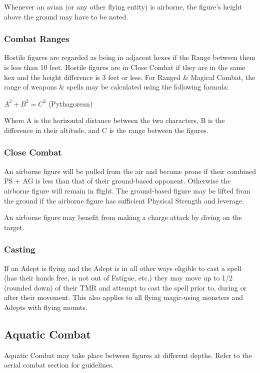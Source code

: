 \begin{multicols*}{3}
Whenever an avian (or any other flying entity) is airborne, the
figure's height above the ground may have to be noted.

\subsubsection{Combat Ranges}

Hostile figures are regarded as being in adjacent hexes if the Range
between them is less than 10 feet. Hostile figures are in Close Combat
if they are in the same hex and the height difference is 3 feet or
less. For Ranged \& Magical Combat, the range of weapons \& spells may
be calculated using the following formula:

$A^2 + B^2 = C^2$ (Pythagorean)

Where A is the horizontal distance between the two characters, B is
the difference in their altitude, and C is the range between the
figures.

\subsubsection{Close Combat}

An airborne figure will be pulled from the air and become prone if
their combined PS + AG is less than that of their ground-based
opponent. Otherwise the airborne figure will remain in flight. The
ground-based figure may be lifted from the ground if the airborne
figure has sufficient Physical Strength and leverage.

An airborne figure may benefit from making a charge attack by diving
on the target.

\subsubsection{Casting}

If an Adept is flying and the Adept is in all other ways eligible to
cast a spell (has their hands free, is not out of Fatigue, etc.) they
may move up to 1/2 (rounded down) of their TMR and attempt to cast the
spell prior to, during or after their movement. This also applies to
all flying magic-using monsters and Adepts with flying mounts.

\subsection{Aquatic Combat}
Aquatic Combat may take place between figures at different depths. Refer to
the aerial combat section for guidelines. 


\end{multicols*}

